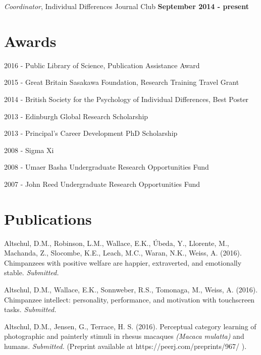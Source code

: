\documentclass[margin,line]{res}
\newenvironment{list1}{
  \begin{list}{\ding{113}}{%
      \setlength{\itemsep}{0in}
      \setlength{\parsep}{0in} \setlength{\parskip}{0in}
      \setlength{\topsep}{0in} \setlength{\partopsep}{0in} 
      \setlength{\leftmargin}{0.17in}}}{\end{list}}
\begin{document}
\begin{resume}
\vspace{-.2cm}
{\em Coordinator}, Individual Differences Journal Club \hfill   {\bf September 2014 - present}\\
\vspace{-.5cm}


\vspace{0.7cm}

\section{\sc Awards} 
\begin{list1}

\item[2016] - Public Library of Science, Publication Assistance Award
\item[2015] - Great Britain Sasakawa Foundation, Research Training Travel Grant
\item[2014] - British Society for the Psychology of Individual Differences, Best Poster
\item[2013] - Edinburgh Global Research Scholarship
\item[2013] - Principal's Career Development PhD Scholarship
\item[2008] - Sigma Xi
\item[2008] - Umaer Basha Undergraduate Research Opportunities Fund
\item[2007] - John Reed Undergraduate Research Opportunities Fund

\end{list1}

\vspace{0.7cm}

\section{\sc Publications} 

Altschul, D.M., Robinson, L.M., Wallace, E.K., \'{U}beda, Y., Llorente, M., Machanda, Z., Slocombe, K.E., Leach, M.C., Waran, N.K., Weiss, A. (2016). Chimpanzees with positive welfare are happier, extraverted, and emotionally stable. {\it Submitted.}

Altschul, D.M., Wallace, E.K., Sonnweber, R.S., Tomonaga, M., Weiss, A. (2016). Chimpanzee intellect: personality, performance, and motivation with touchscreen tasks. {\it Submitted.}

Altschul, D.M., Jensen, G.,  Terrace, H. S. (2016). Perceptual category learning of photographic and painterly stimuli in rhesus macaques {\it (Macaca mulatta)} and humans.  {\it Submitted.} (Preprint available at https://peerj.com/preprints/967/ ).


\end{resume}
\end{document}
